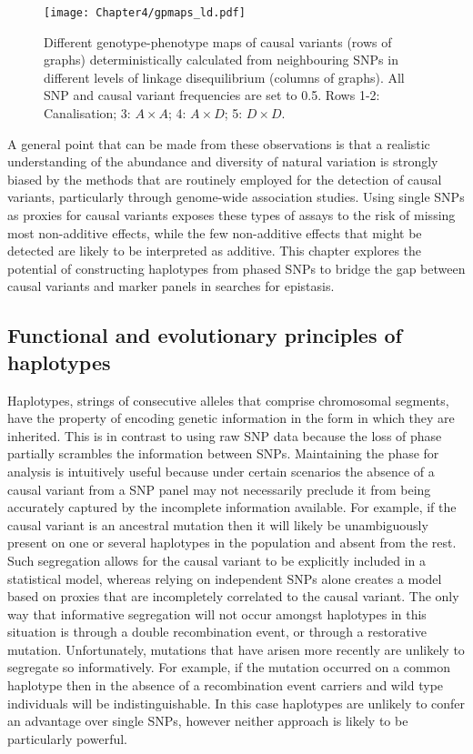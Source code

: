 \begin{figure}
\begin{center}
\begin{center}
\texttt{[image: Chapter4/gpmaps\_ld.pdf]}
\caption[Effect on LD on GP map estimation]{Different genotype-phenotype maps of causal variants (rows of graphs) deterministically calculated from neighbouring SNPs in different levels of linkage disequilibrium (columns of graphs). All SNP and causal variant frequencies are set to 0.5. Rows 1-2: Canalisation; 3: $A \times A$; 4: $A \times D$; 5: $D \times D$.}
\label{fig:gpmaps_ld}
\end{center}
\end{center}
\end{figure}

A general point that can be made from these observations is that a realistic understanding of the abundance and diversity of natural variation is strongly biased by the methods that are routinely employed for the detection of causal variants, particularly through genome-wide association studies. Using single SNPs as proxies for causal variants exposes these types of assays to the risk of missing most non-additive effects, while the few non-additive effects that might be detected are likely to be interpreted as additive. This chapter explores the potential of constructing haplotypes from phased SNPs to bridge the gap between causal variants and marker panels in searches for epistasis.


\subsection{Functional and evolutionary principles of haplotypes}

Haplotypes, strings of consecutive alleles that comprise chromosomal segments, have the property of encoding genetic information in the form in which they are inherited. This is in contrast to using raw SNP data because the loss of phase partially scrambles the information between SNPs. Maintaining the phase for analysis is intuitively useful because under certain scenarios the absence of a causal variant from a SNP panel may not necessarily preclude it from being accurately captured by the incomplete information available. For example, if the causal variant is an ancestral mutation then it will likely be unambiguously present on one or several haplotypes in the population and absent from the rest. Such segregation allows for the causal variant to be explicitly included in a statistical model, whereas relying on independent SNPs alone creates a model based on proxies that are incompletely correlated to the causal variant. The only way that informative segregation will not occur amongst haplotypes in this situation is through a double recombination event, or through a restorative mutation. Unfortunately, mutations that have arisen more recently are unlikely to segregate so informatively. For example, if the mutation occurred on a common haplotype then in the absence of a recombination event carriers and wild type individuals will be indistinguishable. In this case haplotypes are unlikely to confer an advantage over single SNPs, however neither approach is likely to be particularly powerful.

